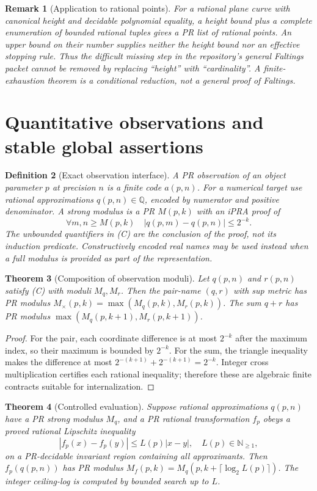 \documentclass[11pt]{article}
\newtheorem{theorem}{Theorem}[section]\newtheorem{lemma}[theorem]{Lemma}\newtheorem{proposition}[theorem]{Proposition}\newtheorem{corollary}[theorem]{Corollary}\newtheorem{definition}[theorem]{Definition}\newtheorem{remark}[theorem]{Remark}
\newcommand{\N}{\mathbb N}\newcommand{\PR}{\mathrm{PR}}\newcommand{\Good}{\mathrm{Good}}\newcommand{\Bad}{\mathrm{Bad}}\newcommand{\obs}{\mathrm{obs}}
\begin{document}
\begin{remark}[Application to rational points]
For a rational plane curve with canonical height and decidable polynomial equality, a height bound plus a complete enumeration of bounded rational tuples gives a PR list of rational points. An upper bound on their number supplies neither the height bound nor an effective stopping rule. Thus the difficult missing step in the repository's general Faltings packet cannot be removed by replacing ``height'' with ``cardinality''. A finite-exhaustion theorem is a conditional reduction, not a general proof of Faltings.\end{remark}

\section{Quantitative observations and stable global assertions}
\begin{definition}[Exact observation interface]
A PR observation of an object parameter \(p\) at precision \(n\) is a finite code \(a(p,n)\). For a numerical target use rational approximations \(q(p,n)\in\mathbb Q\), encoded by numerator and positive denominator. A \emph{strong modulus} is a PR \(M(p,k)\) with an iPRA proof of
\[ \forall m,n\ge M(p,k)\quad |q(p,m)-q(p,n)|\le 2^{-k}.\tag{C}\]
The unbounded quantifiers in (C) are the \emph{conclusion} of the proof, not its induction predicate. Constructively encoded real names may be used instead when a full modulus is provided as part of the representation.
\end{definition}
\begin{theorem}[Composition of observation moduli]\label{thm:mod}
Let \(q(p,n)\) and \(r(p,n)\) satisfy (C) with moduli \(M_q,M_r\). Then the pair-name \((q,r)\) with sup metric has PR modulus \(M_{\times}(p,k)=\max(M_q(p,k),M_r(p,k))\). The sum \(q+r\) has PR modulus \(\max(M_q(p,k+1),M_r(p,k+1))\).
\end{theorem}
\begin{proof}For the pair, each coordinate difference is at most \(2^{-k}\) after the maximum index, so their maximum is bounded by \(2^{-k}\). For the sum, the triangle inequality makes the difference at most \(2^{-(k+1)}+2^{-(k+1)}=2^{-k}\). Integer cross multiplication certifies each rational inequality; therefore these are algebraic finite contracts suitable for internalization.\end{proof}
\begin{theorem}[Controlled evaluation]\label{thm:lipschitz}
Suppose rational approximations \(q(p,n)\) have a PR strong modulus \(M_q\), and a PR rational transformation \(f_p\) obeys a proved rational Lipschitz inequality
\[ |f_p(x)-f_p(y)|\le L(p)|x-y|,\quad L(p)\in\N_{\ge1}, \]
on a PR-decidable invariant region containing all approximants. Then \(f_p(q(p,n))\) has PR modulus \(M_f(p,k)=M_q(p,k+\lceil\log_2 L(p)\rceil)\). The integer ceiling-log is computed by bounded search up to \(L\).
\end{theorem}
\end{document}
